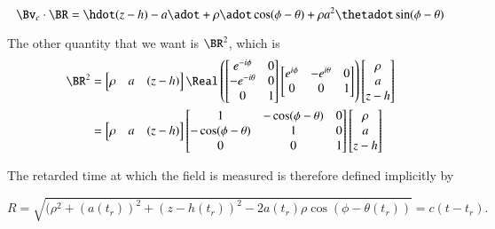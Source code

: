{\begin{equation}\label{eqn:relativisticElectrodynamicsExamReflection:880}
\Bv_c \cdot \BR = \hdot (z - h) -a \adot + \rho \adot \cos(\phi- \theta) + \rho a^2 \thetadot \sin(\phi - \theta)
\end{equation}

The other quantity that we want is \(\BR^2\), which is
\begin{equation}\label{eqn:relativisticElectrodynamicsExamReflection:1270}
\begin{aligned}
\BR^2 &=
\begin{bmatrix}
\rho &
a &
(z - h)
\end{bmatrix}
\Real \left(
\begin{bmatrix}
e^{-i\phi}  & 0 \\
-e^{-i\theta}  & 0 \\
0 & 1
\end{bmatrix}
\begin{bmatrix}
e^{i\phi} & -e^{i\theta} & 0 \\
0 & 0 & 1
\end{bmatrix}
\right)
\begin{bmatrix}
\rho \\
a \\
z - h
\end{bmatrix} \\
&=
\begin{bmatrix}
\rho &
a &
(z - h)
\end{bmatrix}
\begin{bmatrix}
1 & -\cos(\phi-\theta) & 0 \\
-\cos(\phi-\theta) & 1 & 0 \\
0 & 0 & 1
\end{bmatrix}
\begin{bmatrix}
\rho \\
a \\
z - h
\end{bmatrix} \\
\end{aligned}
\end{equation}

The retarded time at which the field is measured is therefore defined implicitly by

\begin{equation}\label{eqn:relativisticElectrodynamicsExamReflection:900}
R = \sqrt{(\rho^2 + (a(t_r))^2 + (z-h(t_r))^2 - 2 a(t_r) \rho \cos(\phi - \theta(t_r))} = c( t - t_r).
\end{equation}

}
